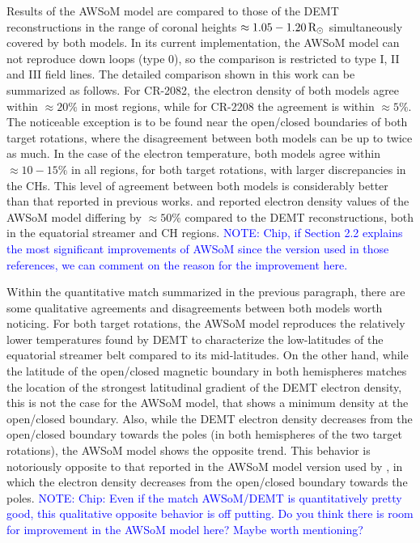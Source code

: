 \documentclass[namedreferences]{solarphysics}
\newcommand{\mrsun}{{\rm R_\odot}}
\def\notebyalbert#1{\textcolor{blue}{NOTE: #1}}
\begin{document}
\begin{article}
Results of the AWSoM model are compared to those of the DEMT reconstructions in the range of coronal heights $\approx 1.05-1.20\,\mrsun$ simultaneously covered by both models. In its current implementation, the AWSoM model can not reproduce down loops (type 0), so the comparison is restricted to type I, II and III field lines. The detailed comparison shown in this work can be summarized as follows. For CR-2082, the electron density of both models agree within $\approx 20\%$ {in most regions}, while for CR-2208 the agreement is within $\approx 5\%$. {The noticeable exception is to be found near the open/closed boundaries of both target rotations, where the disagreement between both models can be up to twice as much.} In the case of the electron temperature, both models agree within $\approx 10-15\%$ in all regions, for both target rotations{, with larger discrepancies in the CHs.} This level of agreement between both models is considerably better than that reported in previous works. \citet{oran_2015} and \citet{jin_2012} reported electron density values of the AWSoM model {differing by $\approx 50\%$ compared to the DEMT reconstructions, both in the equatorial streamer and CH regions.} \notebyalbert{Chip, if Section 2.2 explains the most significant improvements of AWSoM since the version used in those references, we can comment on the reason for the improvement here.}


{Within the quantitative match summarized in the previous paragraph, there are some qualitative agreements and disagreements between both models worth noticing. For both target rotations, the AWSoM model reproduces the relatively lower temperatures found by DEMT to characterize the low-latitudes of the equatorial streamer belt compared to its mid-latitudes. On the other hand, while the latitude of the open/closed magnetic boundary in both hemispheres matches the location of the strongest latitudinal gradient of the DEMT electron density, this is not the case for the AWSoM model, that shows a minimum density at the open/closed boundary. Also, while the DEMT electron density decreases from the open/closed boundary towards the poles (in both hemispheres of the two target rotations), the AWSoM model shows the opposite trend. This behavior is notoriously opposite to that reported in the AWSoM model version used by \citet{oran_2015}, in which the electron density decreases from the open/closed boundary towards the poles.} \notebyalbert{Chip: Even if the match AWSoM/DEMT is quantitatively pretty good, this qualitative opposite behavior is off putting. Do you think there is room for improvement in the AWSoM model here? Maybe worth mentioning?}


\end{article}
\end{document}
